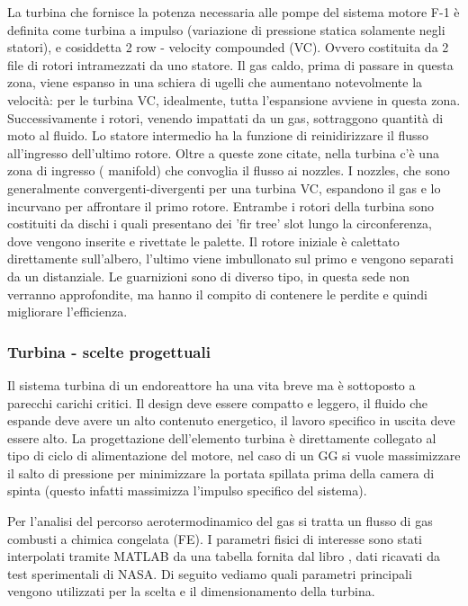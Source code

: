 
La turbina che fornisce la potenza necessaria alle pompe del sistema motore F-1 è definita come turbina a impulso (variazione di pressione statica solamente negli statori), e cosiddetta 2 row - velocity compounded (VC). Ovvero costituita da 2 file di rotori intramezzati da uno statore. Il gas caldo, prima di passare in questa zona, viene espanso in una schiera di ugelli che aumentano notevolmente la velocità: per le turbina VC, idealmente, tutta l'espansione avviene in questa zona. Successivamente i rotori, venendo impattati da un gas, sottraggono quantità di moto al fluido. Lo statore intermedio ha la funzione di reinidirizzare il flusso all'ingresso dell'ultimo rotore. Oltre a queste zone citate, nella turbina c'è una zona di ingresso ( manifold) che convoglia il flusso ai nozzles. I nozzles, che sono generalmente convergenti-divergenti per una turbina VC, espandono il gas e lo incurvano per affrontare il primo rotore. Entrambe i rotori della turbina sono costituiti da dischi i quali presentano dei 'fir tree' slot lungo la circonferenza, dove vengono inserite e rivettate le palette. Il rotore iniziale è calettato direttamente sull'albero, l'ultimo viene imbullonato sul primo e vengono separati da un distanziale. Le guarnizioni sono di diverso tipo, in questa sede non verranno approfondite, ma hanno il compito di contenere le perdite e quindi migliorare l'efficienza. \cite{AIAA_book_2} \cite{turbine_design}

\subsubsection{Turbina - scelte progettuali}

Il sistema turbina di un endoreattore ha una vita breve ma è sottoposto a parecchi carichi critici. Il design deve essere compatto e leggero, il fluido che espande deve avere un alto contenuto energetico, il lavoro specifico in uscita deve essere alto. La progettazione dell'elemento turbina è direttamente collegato al tipo di ciclo di alimentazione del motore, nel caso di un GG si vuole massimizzare il salto di pressione per minimizzare la portata spillata prima della camera di spinta (questo infatti massimizza l'impulso specifico del sistema). 

Per l'analisi del percorso aerotermodinamico del gas si tratta un flusso di gas combusti a chimica congelata (FE). I parametri fisici di interesse sono stati interpolati tramite MATLAB da una tabella fornita dal libro \cite{AIAA_book_2}, dati ricavati da test sperimentali di NASA. Di seguito vediamo quali parametri principali vengono utilizzati per la scelta e il dimensionamento della turbina. 

